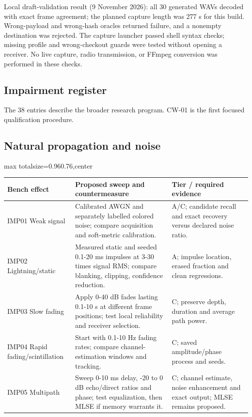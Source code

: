 \documentclass[11pt,a4paper]{article}
\newlength{\tableavail}
\renewcommand{\arraystretch}{1.13}
\begin{document}
Local draft-validation result (9 November 2026): all 30 generated WAVs decoded with exact frame agreement; the planned capture length was 277 s for this build. Wrong-payload and wrong-hash oracles returned failure, and a nonempty destination was rejected. The capture launcher passed shell syntax checks; missing profile and wrong-checkout guards were tested without opening a receiver. No live capture, radio transmission, or FFmpeg conversion was performed in these checks.


\begin{landscape}\thispagestyle{plain}\centering
\section{Impairment register}
\label{md:18}
The 38 entries describe the broader research program. CW-01 is the first focused qualification procedure.

\subsection{Natural propagation and noise}

\setlength{\tabcolsep}{5pt}\renewcommand{\arraystretch}{1.25}
\setlength{\tableavail}{\dimexpr\linewidth-4\tabcolsep\relax}
\begin{adjustbox}{max totalsize={0.96\linewidth}{0.76\textheight},center}
\begin{tabular}{@{}>{\raggedright\arraybackslash}p{0.23\tableavail}>{\raggedright\arraybackslash}p{0.54\tableavail}>{\raggedright\arraybackslash}p{0.23\tableavail}@{}}
\toprule
\textbf{Bench effect} & \textbf{Proposed sweep and countermeasure} & \textbf{Tier / required evidence}\\
\midrule
IMP01 Weak signal & Calibrated AWGN and separately labelled colored noise; compare acquisition and soft-metric calibration. & A/C; candidate recall and exact recovery versus declared noise ratio.\\[5pt]
IMP02 Lightning/static & Measured static and seeded 0.1-20 ms impulses at 3-30 times signal RMS; compare blanking, clipping, confidence reduction. & A; impulse location, erased fraction and clean regressions.\\[5pt]
IMP03 Slow fading & Apply 0-40 dB fades lasting 0.1-10 s at different frame positions; test local reliability and receiver selection. & C; preserve depth, duration and average path power.\\[5pt]
IMP04 Rapid fading/scintillation & Start with 0.1-10 Hz fading rates; compare channel-estimation windows and tracking. & C; saved amplitude/phase process and seeds.\\[5pt]
IMP05 Multipath & Sweep 0-10 ms delay, -20 to 0 dB echo/direct ratios and phase; test equalization, then MLSE if memory warrants it. & C; channel estimate, noise enhancement and exact output; MLSE remains proposed.\\[5pt]
\bottomrule
\end{tabular}
\end{adjustbox}
\end{landscape}
\end{document}

